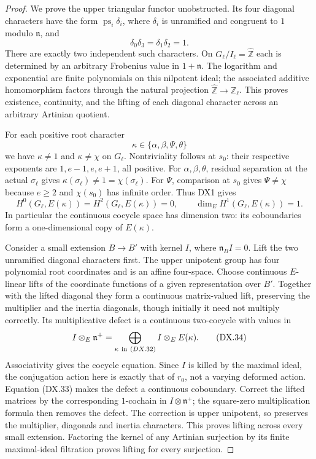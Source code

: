 \begin{proof}
We prove the upper triangular functor unobstructed.
Its four diagonal characters have the form
$\operatorname{ps}_i\delta_i$, where $\delta_i$ is unramified
and congruent to $1$ modulo $\mathfrak n$, and
\[
                 \delta_0\delta_3=\delta_1\delta_2=1.
 \tag{DX.31}
\]
There are exactly two independent such characters.
On $G_\ell/I_\ell=\widehat{\mathbb Z}$ each is determined
by an arbitrary Frobenius value in $1+\mathfrak n$.
The logarithm and exponential are finite polynomials on
this nilpotent ideal; the associated additive homomorphism
factors through the natural projection
$\widehat{\mathbb Z}\to\mathbb Z_\ell$.
This proves existence, continuity, and the lifting of each
diagonal character across an arbitrary Artinian quotient.

For each positive root character
\[
                    \kappa\in\{\alpha,\beta,\Psi,\theta\}
 \tag{DX.32}
\]
we have $\kappa\ne1$ and $\kappa\ne\chi$ on $G_\ell$.
Nontriviality follows at $s_0$: their respective exponents
are $1,e-1,e,e+1$, all positive.
For $\alpha,\beta,\theta$, residual separation at the
actual $\sigma_\ell$ gives
$\kappa(\sigma_\ell)\ne1=\chi(\sigma_\ell)$.
For $\Psi$, comparison at $s_0$ gives $\Psi\ne\chi$
because $e\ge2$ and $\chi(s_0)$ has infinite order.
Thus DX1 gives
\[
 H^0(G_\ell,E(\kappa))=H^2(G_\ell,E(\kappa))=0,\qquad
 \dim_EH^1(G_\ell,E(\kappa))=1.
 \tag{DX.33}
\]
In particular the continuous cocycle space has dimension
two: its coboundaries form a one-dimensional copy of
$E(\kappa)$.

Consider a small extension $B\to B'$ with kernel $I$,
where $\mathfrak n_B I=0$.
Lift the two unramified diagonal characters first.
The upper unipotent group has four polynomial root
coordinates and is an affine four-space.
Choose continuous $E$-linear lifts of the coordinate
functions of a given representation over $B'$.
Together with the lifted diagonal they form a continuous
matrix-valued lift, preserving the multiplier and the
inertia diagonals, though initially it need not multiply
correctly.
Its multiplicative defect is a continuous two-cocycle with
values in
\[
 I\otimes_E\mathfrak n^+
   =\bigoplus_{\kappa\ {\rm in}\ (DX.32)}
                              I\otimes_EE(\kappa).
 \tag{DX.34}
\]
Associativity gives the cocycle equation.  Since $I$ is
killed by the maximal ideal, the conjugation action here
is exactly that of $r_0$, not a varying deformed action.
Equation (DX.33) makes the defect a continuous coboundary.
Correct the lifted matrices by the corresponding
$1$-cochain in $I\otimes\mathfrak n^+$; the square-zero
multiplication formula then removes the defect.
The correction is upper unipotent, so preserves the
multiplier, diagonals and inertia characters.
This proves lifting across every small extension.
Factoring the kernel of any Artinian surjection by its
finite maximal-ideal filtration proves lifting for every
surjection.


\end{proof}
